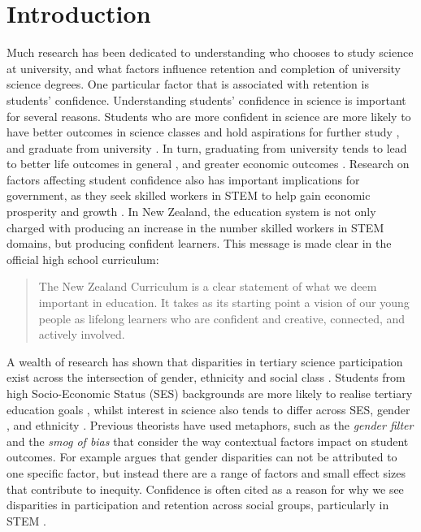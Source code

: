 \section*{Introduction}
\label{intro}
Much research has been dedicated to understanding who chooses to study science at university, and what factors influence retention and completion of university science degrees. One particular factor that is associated with retention is students' confidence. Understanding students' confidence in science is important for several reasons. Students who are more confident in science are more likely to have better outcomes in science classes \cite{uccar2017role,tighezza2014modeling,chang2008science,peters2013examining} and hold aspirations for further study \cite{mujtaba2018students}, and graduate from university \cite{larson2015predicting}. In turn, graduating from university tends to lead to better life outcomes in general \cite{Oreopoulos_2007}, and greater economic outcomes \cite{norton2016mapping,mahoney2013moving}. Research on factors affecting student confidence also has important implications for government, as they seek skilled workers in STEM to help gain economic prosperity and growth \cite{pricewaterhousecoopers2015smart}. In New Zealand, the education system is not only charged with producing an increase in the number skilled workers in STEM domains, but producing confident learners. This message is made clear in the official high school curriculum:
\begin{quote}
   The New Zealand Curriculum is a clear statement of what we deem important in education. It takes as its starting point a vision of our young people as lifelong learners who are confident and creative, connected, and actively involved.
\end{quote} \cite{NZC}

A wealth of research has shown that disparities in tertiary science participation exist across the intersection of gender, ethnicity and social class \cite{reynolds2011change,meehan2017explaining}. Students from high Socio-Economic Status (SES) backgrounds are more likely to realise tertiary education goals \cite{reynolds2011change}, whilst interest in science also tends to differ across SES, gender \cite{cheryan2017some}, and ethnicity \cite{Wong2016ScienceStudents}. Previous theorists have used metaphors, such as the \textit{gender filter} \cite{Blickenstaff_2005} and the \textit{smog of bias} \cite{Kost_Smith_2010} that consider the way contextual factors impact on student outcomes. For example \cite{Kost_Smith_2010} argues that gender disparities can not be attributed to one specific factor, but instead there are a range of factors and small effect sizes that contribute to inequity. Confidence is often cited as a reason for why we see disparities in participation and retention across social groups, particularly in STEM \cite{Blickenstaff_2005}.  

